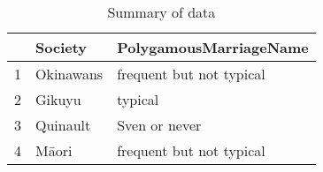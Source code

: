 \begin{table}[ht]
\centering
\begin{tabular}{rll}
  \hline
 & Society & PolygamousMarriageName \\ 
  \hline
1 & Okinawans & frequent but not typical \\ 
  2 & Gikuyu & typical \\ 
  3 & Quinault & Sven or never \\ 
  4 & Māori & frequent but not typical \\ 
   \hline
\end{tabular}
\caption{Summary of data} 
\end{table}
